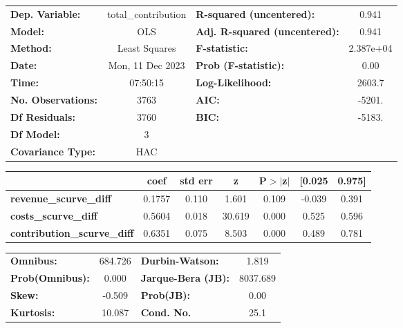 \begin{center}
\begin{tabular}{lclc}
\toprule
\textbf{Dep. Variable:}             & total\_contribution & \textbf{  R-squared (uncentered):}      &     0.941   \\
\textbf{Model:}                     &         OLS         & \textbf{  Adj. R-squared (uncentered):} &     0.941   \\
\textbf{Method:}                    &    Least Squares    & \textbf{  F-statistic:       }          & 2.387e+04   \\
\textbf{Date:}                      &   Mon, 11 Dec 2023  & \textbf{  Prob (F-statistic):}          &     0.00    \\
\textbf{Time:}                      &       07:50:15      & \textbf{  Log-Likelihood:    }          &    2603.7   \\
\textbf{No. Observations:}          &          3763       & \textbf{  AIC:               }          &    -5201.   \\
\textbf{Df Residuals:}              &          3760       & \textbf{  BIC:               }          &    -5183.   \\
\textbf{Df Model:}                  &             3       & \textbf{                     }          &             \\
\textbf{Covariance Type:}           &         HAC         & \textbf{                     }          &             \\
\bottomrule
\end{tabular}
\begin{tabular}{lcccccc}
                                    & \textbf{coef} & \textbf{std err} & \textbf{z} & \textbf{P$> |$z$|$} & \textbf{[0.025} & \textbf{0.975]}  \\
\midrule
\textbf{revenue\_scurve\_diff}      &       0.1757  &        0.110     &     1.601  &         0.109        &       -0.039    &        0.391     \\
\textbf{costs\_scurve\_diff}        &       0.5604  &        0.018     &    30.619  &         0.000        &        0.525    &        0.596     \\
\textbf{contribution\_scurve\_diff} &       0.6351  &        0.075     &     8.503  &         0.000        &        0.489    &        0.781     \\
\bottomrule
\end{tabular}
\begin{tabular}{lclc}
\textbf{Omnibus:}       & 684.726 & \textbf{  Durbin-Watson:     } &    1.819  \\
\textbf{Prob(Omnibus):} &   0.000 & \textbf{  Jarque-Bera (JB):  } & 8037.689  \\
\textbf{Skew:}          &  -0.509 & \textbf{  Prob(JB):          } &     0.00  \\
\textbf{Kurtosis:}      &  10.087 & \textbf{  Cond. No.          } &     25.1  \\
\bottomrule
\end{tabular}
\end{center}